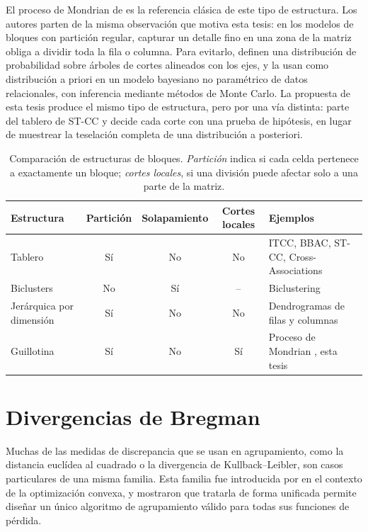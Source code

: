 El proceso de Mondrian de \cite{Roy2008} es la referencia clásica de este tipo de
estructura. Los autores parten de la misma observación que motiva esta tesis: en
los modelos de bloques con partición regular, capturar un detalle fino en una
zona de la matriz obliga a dividir toda la fila o columna. Para evitarlo, definen
una distribución de probabilidad sobre árboles de cortes alineados con los ejes, y
la usan como distribución a priori en un modelo bayesiano no paramétrico de datos
relacionales, con inferencia mediante métodos de Monte Carlo. La propuesta de esta
tesis produce el mismo tipo de estructura, pero por una vía distinta: parte del
tablero de ST-CC y decide cada corte con una prueba de hipótesis, en lugar de
muestrear la teselación completa de una distribución a posteriori.

\begin{table}[ht]
  \centering
  {\footnotesize
  \begin{tabular}{@{}l c c c >{\raggedright\arraybackslash}p{}@{}}
    \toprule
    \textbf{Estructura} & \textbf{Partición} & \textbf{Solapamiento} &
    \textbf{Cortes locales} & \textbf{Ejemplos} \\
    \midrule
    Tablero & Sí & No & No & ITCC, BBAC, ST-CC, Cross-Associations \\
    Biclusters & No & Sí & -- & Biclustering \cite{Castanho2024} \\
    Jerárquica por dimensión & Sí & No & No & Dendrogramas de filas y columnas \\
    Guillotina & Sí & No & Sí & Proceso de Mondrian \cite{Roy2008}, esta tesis \\
    \bottomrule
  \end{tabular}
  }
  \caption{Comparación de estructuras de bloques. \emph{Partición} indica si cada
  celda pertenece a exactamente un bloque; \emph{cortes locales}, si una división
  puede afectar solo a una parte de la matriz.}
  \label{tab:estructuras}
\end{table}

\section{Divergencias de Bregman}\label{sec:bregman}

Muchas de las medidas de discrepancia que se usan en agrupamiento, como la
distancia euclídea al cuadrado o la divergencia de Kullback--Leibler, son casos
particulares de una misma familia. Esta familia fue introducida por
\cite{Bregman1967} en el contexto de la optimización convexa, y
\cite{Banerjee2005} mostraron que tratarla de forma unificada permite diseñar un
único algoritmo de agrupamiento válido para todas sus funciones de pérdida.

